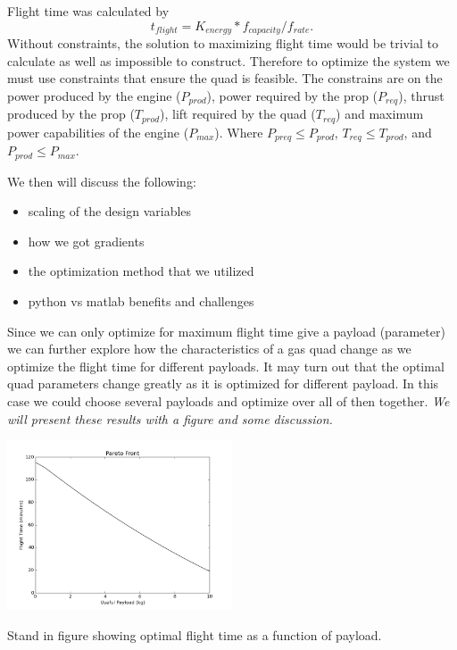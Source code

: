 \documentclass[letterpaper, 10 pt, conference]{ieeeconf}  %
\makeatletter
\newenvironment{figurehere}
  {\def\@captype{figure}}
  {}
\makeatother
\begin{document}
Flight time was calculated by 
\begin{equation}
	t_{flight} = K_{energy}*f_{capacity}/f_{rate}.
\end{equation}
Without constraints, the solution to maximizing flight time would be trivial to calculate as well as impossible to construct. Therefore to optimize the system we must use constraints that ensure the quad is feasible. The constrains are on the power produced by the engine ($P_{prod}$), power required by the prop ($P_{req}$), thrust produced by the prop ($T_{prod}$), lift required by the quad ($T_{req}$) and maximum power capabilities of the engine ($P_{max}$). Where $P_{preq} \leq P_{prod}$, $T_{req} \leq T_{prod}$, and $P_{prod} \leq P_{max}$.

We then will discuss the following:
\begin{itemize}
	\item{scaling of the design variables}
	\item{how we got gradients}
	\item{the optimization method that we utilized}
	\item{python vs matlab benefits and challenges}
\end{itemize}

Since we can only optimize for maximum flight time give a payload (parameter) we can further explore how the characteristics of a gas quad change as we optimize the flight time for different payloads. It may turn out that the optimal quad parameters change greatly as it is optimized for different payload.  In this case we could choose several payloads and optimize over all of then together. \textit{We will present these results with a figure and some discussion.}

\begin{figurehere}
	\includegraphics[width=0.5\textwidth]{pareto_front.png}
	\caption{Stand in figure showing optimal flight time as a function of payload.}
		\label{fig:payload}
\end{figurehere}
\end{document}
